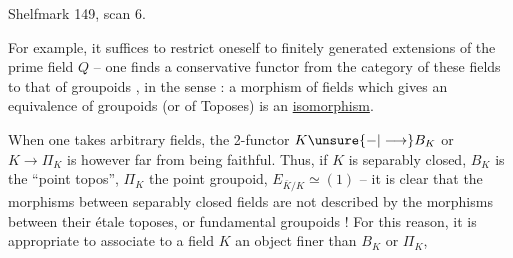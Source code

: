 Shelfmark 149, scan 6.

For example, it suffices to restrict oneself to finitely generated extensions of the prime field $Q$ -- one finds a conservative functor from the category of these fields to that of groupoids , in the sense : a morphism of fields which gives an equivalence of groupoids (or of Toposes) is an \uline{isomorphism}.


When one takes arbitrary fields, the 2-functor $K\unsure{-|\longrightarrow}B_K$ or $K\longrightarrow\Pi_K$  is however far from being faithful. Thus, if $K$ is separably closed, $B_K$ is the ``point topos'', $\Pi_K$ the point groupoid, $E_{\bar K/K}\simeq(1)$ -- it is clear that the morphisms between separably closed fields are not described by the morphisms between their étale toposes, or fundamental groupoids ! For this reason, it is appropriate to associate to a field $K$ an object finer than $B_K$ or $\Pi_K$,
